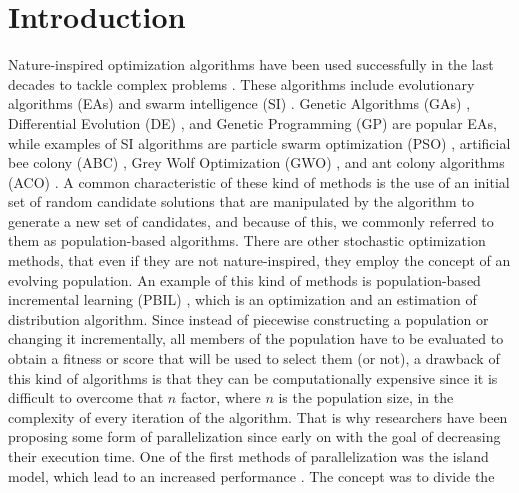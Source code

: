 \section{Introduction}

Nature-inspired optimization algorithms have been used successfully in the last
decades to tackle complex problems \cite{yang2014nature}. These
algorithms include evolutionary algorithms (EAs)
\cite{back1996evolutionary} and swarm intelligence (SI)
\cite{kennedy2006swarm}. 
Genetic Algorithms (GAs) 
\cite{holland1992adaptation,eiben2003genetic}, 
Differential Evolution (DE) \cite{karabouga2004simple}, and 
Genetic Programming (GP) \cite{back1996evolutionary} are popular EAs, while examples of SI algorithms 
\cite{kennedy2006swarm} are particle swarm optimization (PSO)
\cite{clerc2010particle}, artificial bee colony (ABC) \cite{karaboga2005idea}, Grey Wolf Optimization
(GWO) \cite{mirjalili2014grey}, and ant colony algorithms (ACO) \cite{dorigo1999ant}.
A common characteristic of these kind of methods is the
use of an initial set of random candidate solutions that are manipulated by the
algorithm to generate a new set of candidates, and because of this, we commonly
referred to them as population-based algorithms. %
There are other stochastic optimization methods, that even if they are not
nature-inspired, they employ the concept of an evolving population. An example
of this kind of methods is population-based incremental learning (PBIL)
\cite{baluja1994population}, which is an optimization and an estimation of
distribution algorithm. Since instead of piecewise constructing a population or changing it
incrementally, all members of the population have to be evaluated to
obtain a fitness or score that will be used to select them (or not), a
drawback of this kind of algorithms is that they can be computationally
expensive since it is difficult to overcome that $n$ factor, where $n$
is the population size, in the complexity of every iteration of the
algorithm. That is why researchers have been proposing some form of
parallelization since early on \cite{muhlenbein1988evolution} with 
the goal of decreasing their execution time. %
One of the first methods of parallelization was the island
model, which lead to an increased performance
\cite{gorges1990explicit,grosso1985computer}. The concept was to divide the

